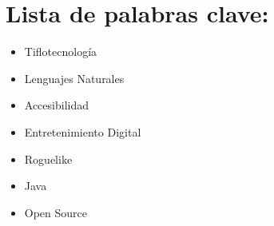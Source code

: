 \section*{Lista de palabras clave:}

\begin{itemize}
  \item Tiflotecnología
  \item Lenguajes Naturales
  \item Accesibilidad
  \item Entretenimiento Digital
  \item Roguelike
  \item Java
  \item Open Source
\end{itemize}
